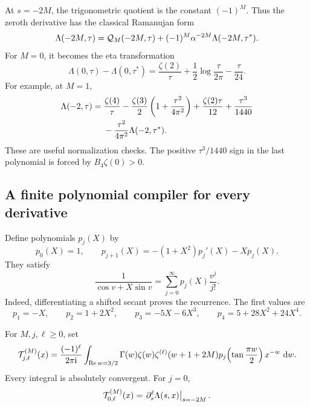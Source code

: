 At \(s=-2M\), the trigonometric quotient is the constant
\((-1)^M\). Thus the zeroth derivative has the classical
Ramanujan form
\begin{equation}\label{eq:ramanujan-recovered}
 \Lambda(-2M,\tau)=
 {\cal Q}_M(-2M,\tau)+(-1)^M\alpha^{-2M}
                         \Lambda(-2M,\tau^*).
\end{equation}
For \(M=0\), it becomes the eta transformation
\begin{equation}\label{eq:eta-recovered}
 \Lambda(0,\tau)-\Lambda(0,\tau^*)
   =\frac{\zeta(2)}{\tau}
     +\frac12\log\frac{\tau}{2\pi}-\frac{\tau}{24}.
\end{equation}
For example, at \(M=1\),
\begin{align}
 \Lambda(-2,\tau)
 ={}&\frac{\zeta(4)}{\tau}
   -\frac{\zeta(3)}2\left(1+\frac{\tau^2}{4\pi^2}\right)
   +\frac{\zeta(2)\tau}{12}+\frac{\tau^3}{1440}\notag\\
 &-\frac{\tau^2}{4\pi^2}\Lambda(-2,\tau^*).
 \label{eq:zeta3-recovered}
\end{align}
These are useful normalization checks. The positive
\(\tau^3/1440\) sign in the last polynomial is forced by
\(B_4\zeta(0)>0\).

\subsection{A finite polynomial compiler for every derivative}

Define polynomials \(p_j(X)\) by
\begin{equation}\label{eq:mod-kernel-recurrence}
 p_0(X)=1,\qquad
 p_{j+1}(X)=-(1+X^2)p_j'(X)-Xp_j(X).
\end{equation}
They satisfy
\begin{equation}\label{eq:mod-kernel-generator}
 \frac1{\cos v+X\sin v}
      =\sum_{j=0}^{\infty}p_j(X)\frac{v^j}{j!}.
\end{equation}
Indeed, differentiating a shifted secant proves the recurrence.
The first values are
\[
 p_1=-X,\qquad p_2=1+2X^2,\qquad
 p_3=-5X-6X^3,\qquad p_4=5+28X^2+24X^4.
\]

For \(M,j,\ell\geq0\), set
\begin{equation}\label{eq:Tmod}
 {\cal T}_{j,\ell}^{(M)}(x)=
 \frac{(-1)^\ell}{2\pi\mathrm i}
 \int_{\operatorname{Re} w=3/2}
  \Gamma(w)\zeta(w)\zeta^{(\ell)}(w+1+2M)
  p_j\!\left(\tan\frac{\pi w}{2}\right)x^{-w}\,\,\mathrm d w.
\end{equation}
Every integral is absolutely convergent. For \(j=0\),
\[
 {\cal T}_{0,\ell}^{(M)}(x)
       =\left.\partial_s^\ell\Lambda(s,x)\right|_{s=-2M}.
\]


